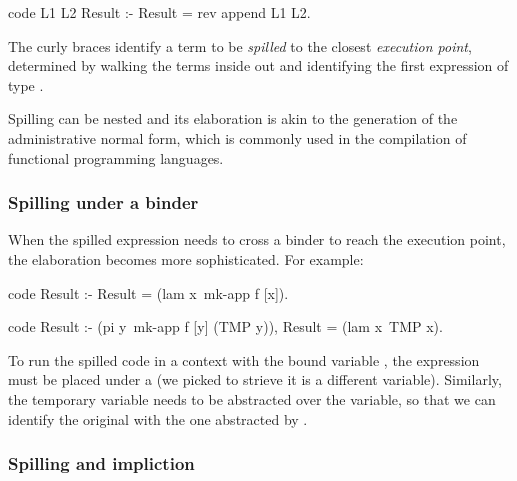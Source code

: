 \documentclass[a4paper, 11pt]{book}
\begin{document}
\begin{elpicode}
code L1 L2 Result :- Result = {rev {append L1 L2}}.
\end{elpicode}

The curly braces identify a term to be \emph{spilled} to the closest
\emph{execution point}, determined by walking the terms inside out
and identifying the first expression of type .

Spilling can be nested and its elaboration is akin to the generation of the
administrative normal form, which is commonly used in 
the compilation of functional programming
languages.

\subsubsection{Spilling under a binder}


When the spilled expression needs to cross a binder to reach the execution
point, the elaboration becomes more sophisticated. For example:

\begin{elpicode}
code Result :- Result = (lam x\ {mk-app f [x]}).

code Result :- (pi y\ mk-app f [y] (TMP y)), Result = (lam x\ TMP x).
\end{elpicode}

\noindent
To run the spilled code in a context with the bound variable , the
expression must be placed under a  (we picked  to strieve it
is a different variable). Similarly, the temporary
variable  needs to be abstracted over the variable, so that we can identify
the original  with the one abstracted by .



\subsubsection{Spilling and impliction}
\end{document}

